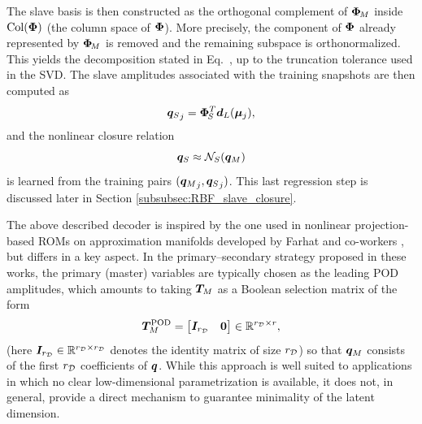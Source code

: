 \documentclass[11pt,a4paper]{article}
\begin{document}
The slave basis is then constructed as the orthogonal complement of $\bm{\Phi}_{\!M}$
inside $\operatorname{Col}(\bm{\Phi})$  (the column space of $\bm{\Phi}$). More precisely, the component of $\bm{\Phi}$ already
represented by $\bm{\Phi}_{\!M}$ is removed and the remaining subspace is
orthonormalized. This yields the decomposition stated in
Eq.~, up to the truncation tolerance
used in the SVD. The slave amplitudes associated with the training snapshots
are then computed as
\[
    {\bm{q}_{S}}_j=\bm{\Phi}_{\!S}^T\bm{d}_L(\bm{\mu}_j),
\]
and the nonlinear closure relation
\begin{equation}
\label{eq:closure}
     \bm{q}_{S}\approx\mathcal{N}_{S}(\bm{q}_M)
\end{equation}
is learned from the training pairs $({\bm{q}_M}_j,{\bm{q}_{S}}_j)$. This last regression
step is discussed later in Section \ref{subsubsec:RBF_slave_closure}.


The above described decoder is inspired by  the one used in nonlinear projection-based ROMs on
approximation manifolds developed by Farhat and co-workers
\cite{barnett2022quadratic,barnett2023neural,ares2026nonlinear}, but differs
in a key aspect. In the primary--secondary strategy proposed in these works,
the primary (master) variables are typically chosen as the leading POD amplitudes, which
amounts to taking $\bm{T}_{M}$ as a Boolean selection matrix of the form
\[
    \bm{T}_{M}^{\mathrm{POD}}
    =
    \begin{bmatrix}
    \bm{I}_{r_{\mathcal{D}}} & \bm{0}
    \end{bmatrix}
    \in\mathbb{R}^{r_{\mathcal{D}}\times r},
\]
(here    $\bm{I}_{r_{\mathcal{D}}}\in\mathbb{R}^{r_{\mathcal{D}}\times r_{\mathcal{D}}}$ denotes the identity matrix of size $r_{\mathcal{D}}$)  so that $\bm{q}_M$ consists of the first $r_{\mathcal{D}}$ coefficients of $\bm{q}$. While this
approach is well suited to applications in which no clear low-dimensional
parametrization is available, it does not, in general, provide a direct
mechanism to guarantee minimality of the latent dimension.

\end{document}
